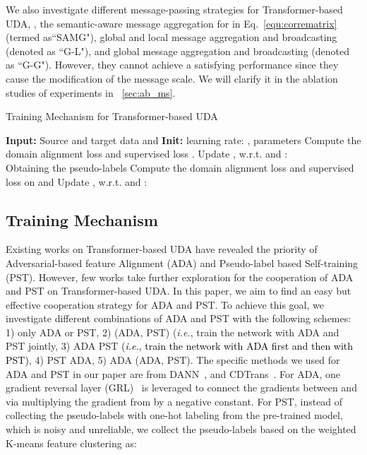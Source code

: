 \documentclass[journal]{IEEEtran}
\newcommand{\tcb}{\textcolor{black}}
\begin{document}
We also investigate different message-passing strategies for Transformer-based UDA, \ieno, the semantic-aware message aggregation for  in Eq.~\ref{equ:corrematrix} (termed as``SAMG"), global and local message aggregation and broadcasting (denoted as ``G-L"), and global message aggregation and broadcasting (denoted as ``G-G"). However, they cannot achieve a satisfying performance since they cause the modification of the message scale. We will clarify it in the ablation studies of experiments in ~\ref{sec:ab_ms}.  
 \begin{algorithm}[t]
\caption{Training Mechanism for Transformer-based UDA}
\label{alg: training}
\begin{algorithmic}[1]
\State \textbf{Input:} Source and target data  and  
\State \textbf{Init:} learning rate: , parameters 
\State Compute the domain alignment loss  and supervised loss .
\State  Update ,  w.r.t.  and : \\
    \quad \quad \quad         
\EndFor 
{}
\State Obtaining the pseudo-labels  
\State 
Compute the domain alignment loss  and supervised loss  on  and 
\State  Update ,  w.r.t.  and : \\
    \quad \quad \quad         
\EndFor 
\end{algorithmic}
\end{algorithm}

\subsection{Training Mechanism}
Existing works on Transformer-based UDA have revealed the  priority of Adversarial-based feature Alignment (ADA) and Pseudo-label based Self-training (PST). However, few works take further exploration for the cooperation of ADA and PST on Transformer-based UDA. In this paper, we aim to find an easy but effective cooperation strategy for ADA and PST. To achieve this goal, we investigate different combinations of ADA and PST with the following schemes: 1) only ADA or PST, 2) (ADA, PST) (\textit{i.e.}, train the network with ADA and PST jointly, 3) ADA  PST \tcb{(\textit{i.e.}, train the network with ADA first and then with PST)}, 4) PST  ADA, 5) ADA  (ADA, PST). The specific methods we used for ADA and PST in our paper are from DANN~\cite{ganin2016domain_dann, sun2022safeSSRT}, and CDTrans~\cite{xu2021cdtransCDTrans}. For ADA, one gradient reversal layer (GRL)~\cite{ganin2016domain_dann} is leveraged to connect the gradients between  and  via multiplying the gradient from  by a negative constant. For PST, instead of collecting the pseudo-labels with one-hot labeling from the pre-trained model, which is noisy and unreliable, we collect the pseudo-labels based on the weighted K-means feature clustering as:
\end{document}
